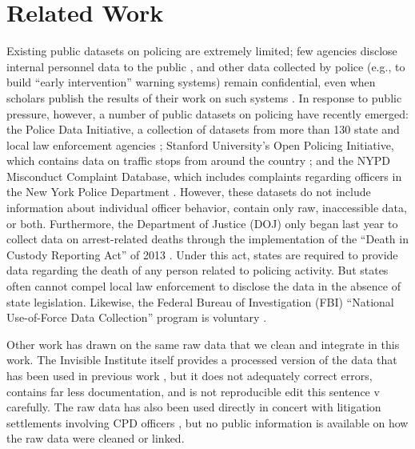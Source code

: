 \section{Related Work}\label{sec:related}
Existing public datasets on policing are extremely limited; 
few agencies disclose internal personnel data to the public \cite{Jackman21},
and other data collected by police (e.g., to build ``early intervention'' warning systems)
remain confidential, even when scholars publish the results of their 
work on such systems \cite{Helsby18}.
In response to public pressure, however, a number of
public datasets on policing have recently emerged: 
the Police Data Initiative, a collection of datasets from 
more than 130 state and local law enforcement agencies \cite{pdi};
Stanford University’s Open Policing Initiative, which contains
data on traffic stops from around the country \cite{sopp}; and
the NYPD Misconduct Complaint Database,
which includes complaints regarding officers in the New York Police Department \cite{nmcd}.
However, these datasets do not include information about individual officer behavior,
contain only raw, inaccessible data, or both.
Furthermore, the Department of Justice
(DOJ) only began last year to collect data on arrest-related deaths through the
implementation of the ``Death in Custody Reporting Act'' of 2013
\cite{DICRA2013}. Under this act, states are required to provide data regarding
the death of any person related to policing activity. But states often cannot compel local
law enforcement to disclose the data in the absence of state legislation.
Likewise, the Federal Bureau of Investigation (FBI) ``National Use-of-Force
Data Collection'' program is voluntary \cite{Gardner2020}.

Other work has drawn on the same raw data that we clean and integrate in this work. 
The Invisible Institute itself provides a processed
version of the data that has been used in previous work \cite{invisdata,ba2021role}, but 
it does not adequately correct errors,
contains far less documentation, and is not reproducible
{\color{red} edit this sentence v carefully}.
The raw data has also been used directly in concert with litigation settlements involving
CPD officers \cite{Rozema19}, but no public information
is available on how the raw data were cleaned or linked.

